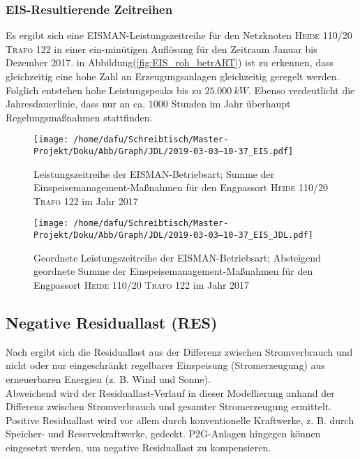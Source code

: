 \documentclass[onecolumn,10pt,titlepage]{article}
\begin{document}
\subsubsection{EIS-Resultierende Zeitreihen}

Es ergibt sich eine EISMAN-Leistungszeitreihe für den Netzknoten \textsc{Heide 110/20 Trafo 122} in einer ein-minütigen  Auflösung für den Zeitraum Januar bis Dezember 2017. in Abbildung(\ref{fig:EIS_roh_betrART}) ist zu erkennen, dass gleichzeitig eine hohe Zahl an Erzeugungsanlagen gleichzeitig geregelt werden. Folglich entstehen hohe Leistungspeaks bis zu $25.000 ~kW$. Ebenso verdeutlicht die Jahresdauerlinie, dass nur an ca. $1000$ Stunden im Jahr überhaupt Regelungsmaßnahmen stattfinden.\\

\begin{figure}[H]
	\centering
	\begin{minipage}[t]{0.49\textwidth}
		\texttt{[image: /home/dafu/Schreibtisch/Master-Projekt/Doku/Abb/Graph/JDL/2019-03-03--10-37\_EIS.pdf]}

		\caption[Leistungszeitreihe der EISMAN-Betriebsart]{Leistungszeitreihe der EISMAN-Betriebsart; Summe der Einspeisemanagement-Maßnahmen für den Engpassort \textsc{Heide 110/20 Trafo 122} im Jahr 2017}
		\label{fig:EIS_roh_betrART}
	\end{minipage}
	\hfill
	\begin{minipage}[t]{0.49\textwidth}
		\texttt{[image: /home/dafu/Schreibtisch/Master-Projekt/Doku/Abb/Graph/JDL/2019-03-03--10-37\_EIS\_JDL.pdf]}
		\caption[Geordnete Leistungszeitreihe der EISMAN-Betriebsart]{Geordnete Leistungszeitreihe der EISMAN-Betriebsart; Absteigend geordnete Summe der Einspeisemanagement-Maßnahmen für den Engpassort \textsc{Heide 110/20 Trafo 122} im Jahr 2017}
		\label{fig:EIS_JDL_betrART}
	\end{minipage}
\end{figure}

%

\subsection{Negative Residuallast (RES)}
Nach \cite{Schiffer.2019} ergibt sich die Residuallast aus der Differenz zwischen Stromverbrauch und nicht oder nur eingeschränkt regelbarer Einspeisung (Stromerzeugung) aus erneuerbaren Energien (z. B. Wind und Sonne). \\
Abweichend wird der Residuallast-Verlauf in dieser Modellierung anhand der Differenz zwischen Stromverbrauch und gesamter Stromerzeugung ermittelt. Positive Residuallast wird vor allem durch konventionelle Kraftwerke, z. B. durch Speicher- und Reservekraftwerke, gedeckt.\cite{Schiffer.2019} P2G-Anlagen hingegen können eingesetzt werden, um negative Residuallast zu kompensieren.
\end{document}
